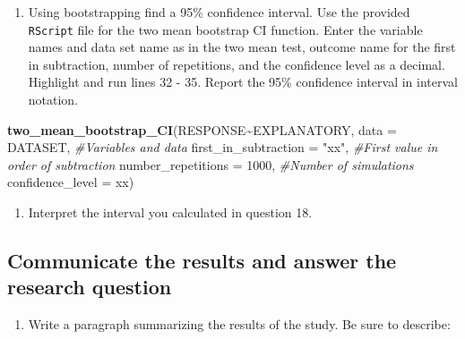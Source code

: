 \documentclass[
]{report}
\newenvironment{Shaded}{\begin{snugshade}}{\end{snugshade}}
\newcommand{\CommentTok}[1]{\textcolor[rgb]{0.56,0.35,0.01}{\textit{#1}}}
\newcommand{\DataTypeTok}[1]{\textcolor[rgb]{0.13,0.29,0.53}{#1}}
\newcommand{\DecValTok}[1]{\textcolor[rgb]{0.00,0.00,0.81}{#1}}
\newcommand{\KeywordTok}[1]{\textcolor[rgb]{0.13,0.29,0.53}{\textbf{#1}}}
\newcommand{\NormalTok}[1]{#1}
\newcommand{\OperatorTok}[1]{\textcolor[rgb]{0.81,0.36,0.00}{\textbf{#1}}}
\newcommand{\StringTok}[1]{\textcolor[rgb]{0.31,0.60,0.02}{#1}}
\providecommand{\tightlist}{%
  \setlength{\itemsep}{0pt}\setlength{\parskip}{0pt}}
\begin{document}
\vspace{0.5in}

\begin{enumerate}
\def\labelenumi{\arabic{enumi}.}
\setcounter{enumi}{17}
\tightlist
\item
  Using bootstrapping find a 95\% confidence interval. Use the provided \texttt{RScript} file for the two mean bootstrap CI function. Enter the variable names and data set name as in the two mean test, outcome name for the first in subtraction, number of repetitions, and the confidence level as a decimal. Highlight and run lines 32 - 35. Report the 95\% confidence interval in interval notation.
\end{enumerate}

\begin{Shaded}
\begin{Highlighting}[]
\KeywordTok{two\_mean\_bootstrap\_CI}\NormalTok{(RESPONSE}\OperatorTok{\textasciitilde{}}\NormalTok{EXPLANATORY, }\DataTypeTok{data =}\NormalTok{ DATASET,  }\CommentTok{\#Variables and data}
                      \DataTypeTok{first\_in\_subtraction =} \StringTok{"xx"}\NormalTok{, }\CommentTok{\#First value in order of subtraction}
                      \DataTypeTok{number\_repetitions =} \DecValTok{1000}\NormalTok{,  }\CommentTok{\#Number of simulations}
                      \DataTypeTok{confidence\_level =}\NormalTok{ xx)}
\end{Highlighting}
\end{Shaded}

\vspace{0.3in}

\begin{enumerate}
\def\labelenumi{\arabic{enumi}.}
\setcounter{enumi}{18}
\tightlist
\item
  Interpret the interval you calculated in question 18.
\end{enumerate}

\vspace{1in}

\hypertarget{communicate-the-results-and-answer-the-research-question}{%
\subsection*{Communicate the results and answer the research question}\label{communicate-the-results-and-answer-the-research-question}}

\begin{enumerate}
\def\labelenumi{\arabic{enumi}.}
\setcounter{enumi}{19}
\tightlist
\item
  Write a paragraph summarizing the results of the study. Be sure to describe:
\end{enumerate}
\end{document}
